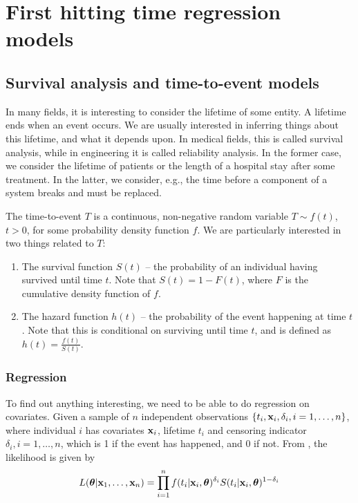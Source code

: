 \chapter{First hitting time regression models}

\section{Survival analysis and time-to-event models}\label{sec:survival}
In many fields, it is interesting to consider the lifetime of some entity. A lifetime ends when an event occurs. We are usually interested in inferring things about this lifetime, and what it depends upon. In medical fields, this is called survival analysis, while in engineering it is called reliability analysis. In the former case, we consider the lifetime of patients or the length of a hospital stay after some treatment. In the latter, we consider, e.g., the time before a component of a system breaks and must be replaced.

The time-to-event $T$ is a continuous, non-negative random variable $T\sim f(t)$, $t>0$, for some probability density function $f$. We are particularly interested in two things related to $T$:
\begin{enumerate}
\item{}The survival function $S(t)$ -- the probability of an individual having survived until time $t$. Note that $S(t)=1-F(t)$, where $F$ is the cumulative density function of $f$.
\item{}The hazard function $h(t)$ -- the probability of the event happening at time $t$. Note that this is conditional on surviving until time $t$, and is defined as $h(t)=\frac{f(t)}{S(t)}$.
\end{enumerate}

\subsection{Regression}\label{sec:surv-reg}
To find out anything interesting, we need to be able to do regression on covariates. Given a sample of $n$ independent observations $\{t_i,\mathbf{x}_i, \delta_i,i=1,\ldots,n\}$, where individual $i$ has covariates $\mathbf{x}_i$, lifetime $t_i$ and censoring indicator $\delta_i, i=1,\ldots, n$, which is 1 if the event has happened, and 0 if not. From \cite[10]{caroni2017}, the likelihood is given by
\begin{equation}\label{eq:surv-lik}
    L(\boldsymbol{\theta}|\mathbf{x}_1,\ldots,\mathbf{x}_n)=\prod_{i=1}^n f(t_i|\mathbf{x}_i,\boldsymbol{\theta})^{\delta_i} S(t_i|\mathbf{x}_i,\boldsymbol{\theta})^{1-\delta_i}
\end{equation}


